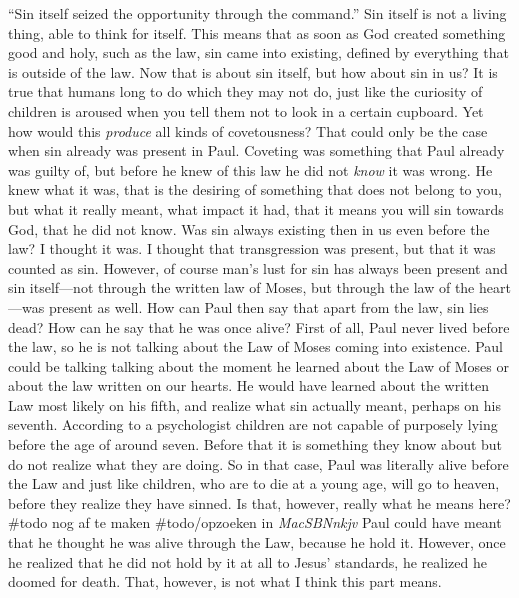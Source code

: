 ``Sin itself seized the opportunity through the command.'' Sin itself is
not a living thing, able to think for itself. This means that as soon as
God created something good and holy, such as the law, sin came into
existing, defined by everything that is outside of the law. Now that is
about sin itself, but how about sin in us? It is true that humans long
to do which they may not do, just like the curiosity of children is
aroused when you tell them not to look in a certain cupboard. Yet how
would this \emph{produce} all kinds of covetousness? That could only be
the case when sin already was present in Paul. Coveting was something
that Paul already was guilty of, but before he knew of this law he did
not \emph{know} it was wrong. He knew what it was, that is the desiring
of something that does not belong to you, but what it really meant, what
impact it had, that it means you will sin towards God, that he did not
know. Was sin always existing then in us even before the law? I thought
it was. I thought that transgression was present, but that it was
counted as sin. However, of course man's lust for sin has always been
present and sin itself---not through the written law of Moses, but
through the law of the heart---was present as well. How can Paul then
say that apart from the law, sin lies dead? How can he say that he was
once alive? First of all, Paul never lived before the law, so he is not
talking about the Law of Moses coming into existence. Paul could be
talking talking about the moment he learned about the Law of Moses or
about the law written on our hearts. He would have learned about the
written Law most likely on his fifth, and realize what sin actually
meant, perhaps on his seventh. According to a psychologist children are
not capable of purposely lying before the age of around seven. Before
that it is something they know about but do not realize what they are
doing. So in that case, Paul was literally alive before the Law and just
like children, who are to die at a young age, will go to heaven, before
they realize they have sinned. Is that, however, really what he means
here? \#todo nog af te maken \#todo/opzoeken in \emph{MacSBNnkjv} Paul
could have meant that he thought he was alive through the Law, because
he hold it. However, once he realized that he did not hold by it at all
to Jesus' standards, he realized he doomed for death. That, however, is
not what I think this part means.

